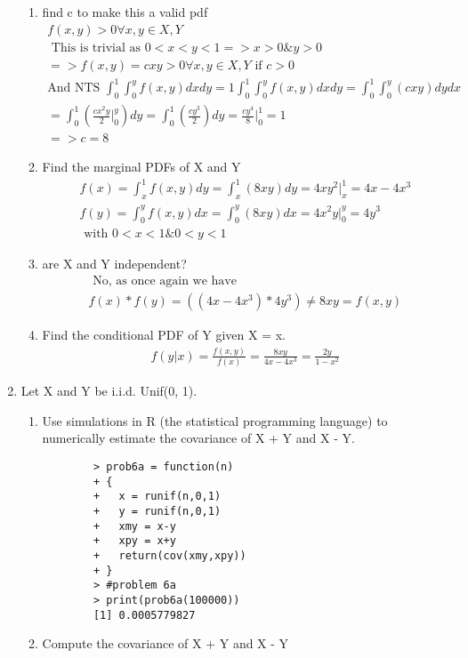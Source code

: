\documentclass[11pt]{article}
\begin{document}
\begin{enumerate}
\begin{enumerate}
	\item find c to make this a valid pdf
	\begin{gather}
			f(x,y)>0 \forall x,y \in X,Y \\
			\text{ This is trivial as } 0<x<y<1 => x>0 \& y>0 \\
			=> f(x,y) = cxy >0 \forall x,y \in X,Y \text{ if }c>0\\
			\text{And NTS } \int_{0}^{1}\int_{0}^{y}f(x,y)dxdy = 1
			\int_{0}^{1}\int_{0}^{y}f(x,y)dxdy = 	\int_{0}^{1}\int_{0}^{y} (cxy)dydx \\
			= \int_{0}^{1}(\frac{cx^2y}{2}\big|_0^y)dy =\int_{0}^{1}(\frac{cy^3}{2})dy = \frac{cy^4}{8}\big|_0^1 = 1\\
			=> c = 8
	\end{gather}
	\item Find the marginal PDFs of X and Y
	\begin{gather}
	f(x) = \int_{x}^{1}f(x,y)dy = \int_{x}^{1}(8xy)dy  = 4xy^2\big|_x^1 = 4x - 4x^3 \\
	f(y) = \int_{0}^{y}f(x,y)dx = \int_{0}^{y}(8xy)dx  = 4x^2y\big|_0^y = 4y^3\\
	\text{ with } 0<x<1 \& 0<y<1
	\end{gather}
	\item are X and Y independent?
	\begin{gather}
		\text{ No, as once again we have }\\
		f(x)*f(y) = ((4x - 4x^3) * 4y^3) \ne 8xy = f(x,y)
	\end{gather}
	\item Find the conditional PDF of Y given X = x.
	\begin{gather}
		f(y|x) = \frac{f(x,y)}{f(x)} = \frac{8xy}{4x - 4x^3} = \frac{2y}{1 - x^2}
	\end{gather}
\end{enumerate}
\item Let X and Y be i.i.d. Unif(0, 1).
\begin{enumerate}
	\item Use simulations in R (the statistical programming language) to numerically estimate the covariance
	of X + Y and X - Y.
	\begin{verbatim}
		> prob6a = function(n)
		+ {
		+   x = runif(n,0,1)
		+   y = runif(n,0,1)
		+   xmy = x-y
		+   xpy = x+y
		+   return(cov(xmy,xpy))
		+ }
		> #problem 6a
		> print(prob6a(100000))
		[1] 0.0005779827
	\end{verbatim}
	\item Compute the covariance of X + Y and X - Y

\end{enumerate}
\end{enumerate}
\end{document}
